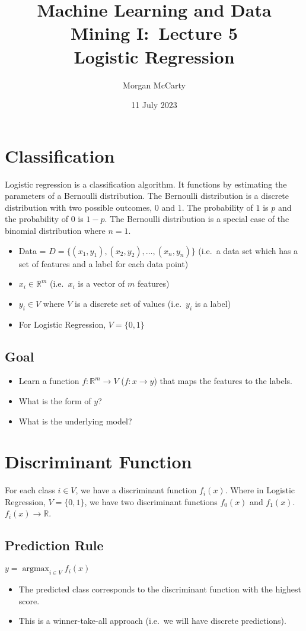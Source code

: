 \documentclass[12pt]{article}
\title{
    Machine Learning and Data Mining I:\ Lecture 5\\
    Logistic Regression}
\author{Morgan McCarty}
\date{11 July 2023}
\DeclareMathOperator*{\argmax}{argmax}
\begin{document}
    \maketitle

    \section{Classification}
        Logistic regression is a classification algorithm. 
        It functions by estimating the parameters of a Bernoulli distribution. 
        The Bernoulli distribution is a discrete distribution with two possible outcomes, $0$ and $1$. 
        The probability of $1$ is $p$ and the probability of $0$ is $1 - p$. 
        The Bernoulli distribution is a special case of the binomial distribution where $n = 1$.
        \begin{itemize}
            \item Data = $D = \{(x_1, y_1), (x_2, y_2), \dots, (x_n, y_n)\}$ (i.e.\ a data set which has a set of features and a label for each data point)
            \item $x_i \in \mathbb{R}^m$ (i.e.\ $x_i$ is a vector of $m$ features)
            \item $y_i \in V$ where $V$ is a discrete set of values (i.e.\ $y_i$ is a label)
            \item For Logistic Regression, $V = \{0, 1\}$
        \end{itemize}
        \subsection{Goal}
            \begin{itemize}
                \item Learn a function $f: \mathbb{R}^m \rightarrow V$ ($f: x \rightarrow y$) that maps the features to the labels.
                \item What is the form of $y$?
                \item What is the underlying model?
            \end{itemize}
    \section{Discriminant Function}
        For each class $i \in V$, we have a discriminant function $f_i(x)$. Where in Logistic Regression, $V = \{0, 1\}$, we have two discriminant functions $f_0(x)$ and $f_1(x)$. $f_i(x) \rightarrow \mathbb{R}$.
        \subsection{Prediction Rule}
            $y = \argmax_{i \in V} f_i(x)$
            \begin{itemize}
                \item The predicted class corresponds to the discriminant function with the highest score.
                \item This is a winner-take-all approach (i.e.\ we will have discrete predictions).
            \end{itemize}
\end{document}
